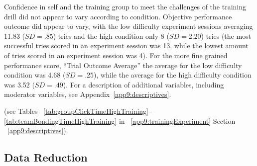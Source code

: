 Confidence in self and the training group to meet the challenges of the training drill did not appear to vary according to condition.  Objective performance outcome did appear to vary, with the low difficulty experiment sessions averaging 11.83 ($SD = .85$) tries and the high condition only 8 ($SD = 2.20$) tries (the most successful tries scored in an experiment session was 13, while the lowest amount of tries scored in an experiment session was 4).  For the more fine grained performance score, ``Trial Outcome Average'' the average for the low difficulty condition was 4.68 ($SD = .25$), while the average for the high difficulty condition was 3.52 ($SD = .49$).   For a description of additional variables, including moderator variables, see Appendix~\ref{app9:descriptives}.









 (see Tables ~\ref{tab:groupClickTimeHighTraining}\nobreakdash--\ref{tab:teamBondingTimeHighTraining} in ~\ref{app9:trainingExperiment} Section ~\ref{app9:descriptives}).







\subsection{Data Reduction}





